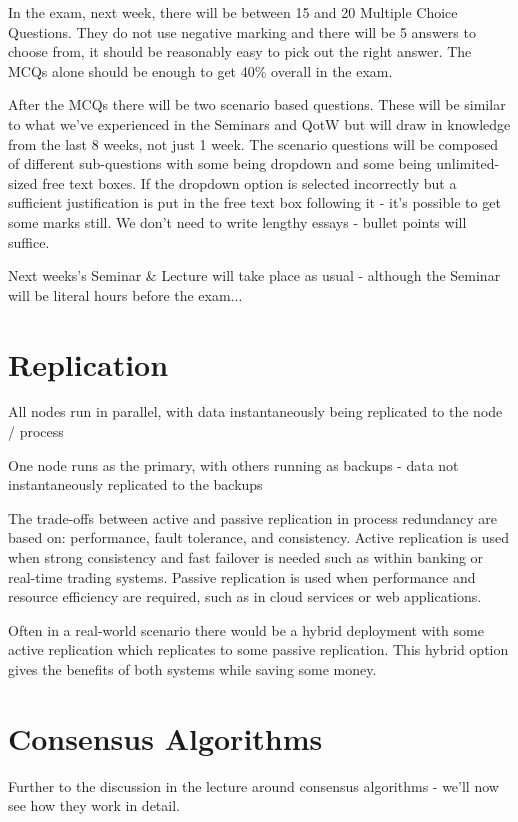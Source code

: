 
In the exam, next week, there will be between 15 and 20 Multiple Choice Questions. They do not use negative marking and there will be 5 answers to choose from, it should be reasonably easy to pick out the right answer. The MCQs alone should be enough to get 40\% overall in the exam. 

After the MCQs there will be two scenario based questions. These will be similar to what we've experienced in the Seminars and QotW but will draw in knowledge from the last 8 weeks, not just 1 week. The scenario questions will be composed of different sub-questions with some being dropdown and some being unlimited-sized free text boxes. If the dropdown option is selected incorrectly but a sufficient justification is put in the free text box following it - it's possible to get some marks still. We don't need to write lengthy essays - bullet points will suffice.

Next weeks's Seminar \& Lecture will take place as usual - although the Seminar will be literal hours before the exam... 

\section{Replication}
\begin{define}
    \item[Active Replication] All nodes run in parallel, with data instantaneously being replicated to the node / process
    \item[Passive Replication] One node runs as the primary, with others running as backups - data not instantaneously replicated to the backups 
\end{define}

The trade-offs between active and passive replication in process redundancy are based on: performance, fault tolerance, and consistency. Active replication is used when strong consistency and fast failover is needed such as within banking or real-time trading systems. Passive replication is used when performance and resource efficiency are required, such as in cloud services or web applications. 

Often in a real-world scenario there would be a hybrid deployment with some active replication which replicates to some passive replication. This hybrid option gives the benefits of both systems while saving some money. 

\section{Consensus Algorithms}
Further to the discussion in the lecture around consensus algorithms - we'll now see how they work in detail. 

